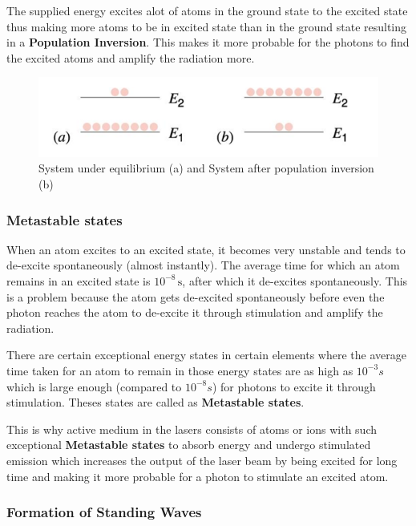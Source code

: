 \documentclass[12pt]{article}
\begin{document}
The supplied energy excites alot of atoms in the ground state to the excited state thus making more atoms to be in excited state than in the ground state resulting in a \textbf{Population Inversion}. This makes it more probable for the photons to find the excited atoms and amplify the radiation more. \vspace{.2cm}

\begin{figure}[H]
    \centering
    \includegraphics[scale=.8]{./img/10_population_inversion.png}
    \caption{System under equilibrium (a) and System after population inversion (b)}
\end{figure}

\subsubsection{Metastable states}

When an atom excites to an excited state, it becomes very unstable and tends to de-excite spontaneously (almost instantly). The average time for which an atom remains in an excited state is $10^{-8}\,\text{s}$, after which it de-excites spontaneously. This is a problem because the atom gets de-excited spontaneously before even the photon reaches the atom to de-excite it through stimulation and amplify the radiation.
\vspace{.2cm}

There are certain exceptional energy states in certain elements where the average time taken for an atom to remain in those energy states are as high as $10^{-3}s$ which is large enough (compared to $10^{-8}s$) for photons to excite it through stimulation. Theses states are called as \textbf{Metastable states}. \vspace{.2cm} 

This is why active medium in the lasers consists of atoms or ions with such exceptional \textbf{Metastable states} to absorb energy and undergo stimulated emission which increases the output of the laser beam by being excited for long time and making it more probable for a photon to stimulate an excited atom.

\subsubsection{Formation of Standing Waves}
\end{document}
